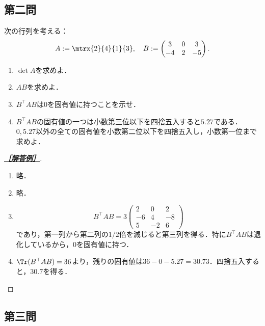 \documentclass[uplatex,dvipdfmx]{jsarticle}
\begin{document}
\subsection{第二問}

\begin{tcolorbox}[colframe=ForestGreen, colback=ForestGreen!10!white,breakable,colbacktitle=ForestGreen!40!white,coltitle=black,fonttitle=\bfseries\sffamily,
    title=第２問]
    \begin{problem}次の行列を考える：
        \[A:=\mtrx{2}{4}{1}{3},\quad B:=\begin{pmatrix}3&0&3\\-4&2&-5\end{pmatrix}.\]
        \begin{enumerate}[{問}1]
            \item $\det A$を求めよ．
            \item $AB$を求めよ．
            \item $B^\top AB$は$0$を固有値に持つことを示せ．
            \item $B^\top AB$の固有値の一つは小数第三位以下を四捨五入すると$5.27$である．$0,5.27$以外の全ての固有値を小数第二位以下を四捨五入し，小数第一位まで求めよ．
        \end{enumerate}
    \end{problem}
\end{tcolorbox}
\begin{proof}[\textbf{\underline{［解答例］}}]\mbox{}
    \begin{enumerate}
        \item 略．
        \item 略．
        \item \[B^\top AB=3\begin{pmatrix}2&0&2\\-6&4&-8\\5&-2&6\end{pmatrix}\]
        であり，第一列から第二列の$1/2$倍を減じると第三列を得る．特に$B^\top AB$は退化しているから，$0$を固有値に持つ．
        \item $\Tr(B^\top AB)=36$より，残りの固有値は$36-0-5.27=30.73$．四捨五入すると，$30.7$を得る．
    \end{enumerate}
\end{proof}

\subsection{第三問}
\end{document}
